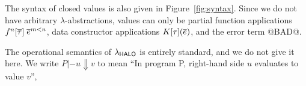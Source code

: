 The syntax of closed values is also given in Figure~\ref{fig:syntax}. Since we do not
have arbitrary $\lambda$-abstractions, values can only be partial function applications
$f^n[\overline{\tau}]\;\overline{e}^{m < n}$, data constructor applications $K[\tau](\overline{e})$,
and the error term @BAD@.

The operational semantics of $\lambda_{\sf HALO}$ is entirely standard, and we do not give it here.
We write $P |- u \Downarrow v$ to mean ``In program P, right-hand side $u$ evaluates to
value $v$'',

%
